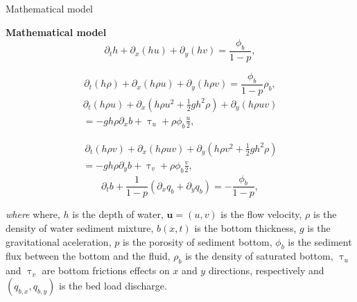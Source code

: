 \documentclass[12pt]{beamer}
\begin{document}
\begin{frame}[t]
\begin{columns}[t]
\begin{column}{0.32\linewidth}
\begin{block}{{\Large Mathematical model}}
				\begin{alertblock}{{\bf Mathematical model}}
					\begin{equation}\label{2d1}
						\partial _t h + \partial _x (hu) + \partial _y (hv) = \frac{\phi _b }{1-p},
					\end{equation}	
					
					\begin{equation}\label{2d2}
						\partial  _t (h\rho)+ \partial _x (h\rho u) + \partial _y (h\rho v) = \frac{\phi _b}{1-p}\rho_b,
					\end{equation}
				\begin{equation}\label{2d3}
					\begin{split}
					 \partial_t (h\rho u) + \partial_x\left( h\rho u^2 + \frac{1}{2}gh^2\rho \right) + \partial _y (h\rho uv)\\ = - gh\rho \partial_x b + \uptau _u
					+\rho \phi_b\frac{u}{2},
				\end{split}
			\end{equation}	
			
			\begin{equation}\label{2d4}
				\begin{aligned}
				& \ \partial _t (h\rho v) + \partial _x (h\rho uv) + \partial_y \left( h\rho v^2 +  \frac{1}{2}gh^2\rho \right) &\\& = - gh\rho \partial_y b + \uptau _v 
				+\rho \phi_b\frac{v}{2},
				\end{aligned}
			\end{equation}
			\begin{equation}\label{2d5}
				\partial_t b + \frac{1}{1-p}\left( \partial _x q_b + \partial _y q_b \right) = -\frac{\phi_b}{1-p},
			\end{equation}		
				\end{alertblock}
				\vspace{0.5cm}
				\begin{exampleblock}{{\it where}}
				 where, $h$ is the depth of water, $\mathbf{u}=(u,v)$ is the  flow velocity, $\rho$ is the density of water sediment mixture, 
$b(x,t)$ is the bottom thickness, $g$ is the gravitational aceleration,
$p$ is the porosity of sediment bottom, $\phi _b$ is the sediment flux between the bottom and the fluid,
$\rho _b$ is the density of saturated bottom, $\uptau _u$ and $\uptau _v$ are bottom frictions effects on $x$ and $y$ directions, 
respectively and $(q_{b,x},q_{b,y})$ is the bed load discharge.

				\end{exampleblock}
				\vspace{0.5cm}
			\end{block}
		\end{column}
		

\end{columns}
\end{frame}
\end{document}
